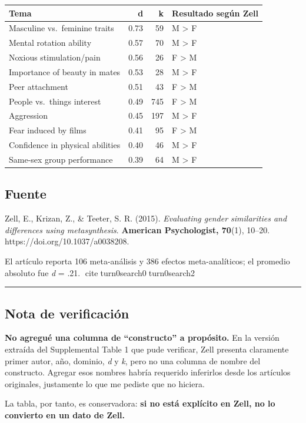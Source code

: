 \documentclass[
  9pt,
]{article}
\newcounter{none} %
\begin{document}
{\def\LTcaptype{none} %
\begin{longtable}[]{@{}lrrl@{}}
\toprule\noalign{}
Tema & d & k & Resultado según Zell \\
\midrule\noalign{}
\endhead
\bottomrule\noalign{}
\endlastfoot
Masculine vs.~feminine traits & 0.73 & 59 & M \textgreater{} F \\
Mental rotation ability & 0.57 & 70 & M \textgreater{} F \\
Noxious stimulation/pain & 0.56 & 26 & F \textgreater{} M \\
Importance of beauty in mates & 0.53 & 28 & M \textgreater{} F \\
Peer attachment & 0.51 & 43 & F \textgreater{} M \\
People vs.~things interest & 0.49 & 745 & F \textgreater{} M \\
Aggression & 0.45 & 197 & M \textgreater{} F \\
Fear induced by films & 0.41 & 95 & F \textgreater{} M \\
Confidence in physical abilities & 0.40 & 46 & M \textgreater{} F \\
Same-sex group performance & 0.39 & 64 & M \textgreater{} F \\
\end{longtable}
}

\subsection{Fuente}\label{fuente}

Zell, E., Krizan, Z., \& Teeter, S. R. (2015). \emph{Evaluating gender
similarities and differences using metasynthesis}. \textbf{American
Psychologist, 70}(1), 10--20. https://doi.org/10.1037/a0038208.

El artículo reporta 106 meta-análisis y 386 efectos meta-analíticos; el
promedio absoluto fue \emph{d} = .21. citeturn0search0turn0search2

\begin{center}\rule{0.5\linewidth}{0.5pt}\end{center}

\subsection{Nota de verificación}\label{nota-de-verificaciuxf3n}

\textbf{No agregué una columna de ``constructo'' a propósito.} En la
versión extraída del Supplemental Table 1 que pude verificar, Zell
presenta claramente primer autor, año, dominio, \emph{d} y \emph{k},
pero no una columna de nombre del constructo. Agregar esos nombres
habría requerido inferirlos desde los artículos originales, justamente
lo que me pediste que no hiciera.

La tabla, por tanto, es conservadora: \textbf{si no está explícito en
Zell, no lo convierto en un dato de Zell.}
\end{document}
